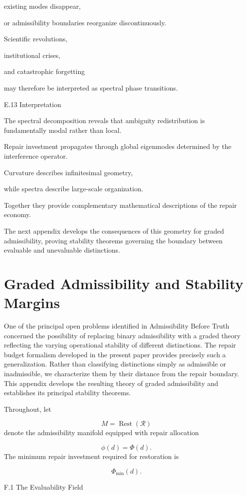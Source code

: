\documentclass[12pt,oneside]{article}
\theoremstyle{plain}
\theoremstyle{definition}
\theoremstyle{remark}
\DeclareMathOperator{\Rest}{Rest}
\begin{document}
existing modes disappear,

or admissibility boundaries reorganize discontinuously.

Scientific revolutions,

institutional crises,

and catastrophic forgetting

may therefore be interpreted as spectral phase transitions.


E.13 Interpretation

The spectral decomposition reveals that ambiguity redistribution is fundamentally modal rather than local.

Repair investment propagates through global eigenmodes determined by the interference operator.

Curvature describes infinitesimal geometry,

while spectra describe large-scale organization.

Together they provide complementary mathematical descriptions of the repair economy.

The next appendix develops the consequences of this geometry for graded admissibility, proving stability theorems governing the boundary between evaluable and unevaluable distinctions.

\section{Graded Admissibility and Stability Margins}

One of the principal open problems identified in Admissibility Before Truth concerned the possibility of replacing binary admissibility with a graded theory reflecting the varying operational stability of different distinctions. The repair budget formalism developed in the present paper provides precisely such a generalization. Rather than classifying distinctions simply as admissible or inadmissible, we characterize them by their distance from the repair boundary. This appendix develops the resulting theory of graded admissibility and establishes its principal stability theorems.

Throughout, let

\[
M=\Rest(\mathcal R)
\]
denote the admissibility manifold equipped with repair allocation

\[
\phi(d)=\Phi(d).
\]
The minimum repair investment required for restoration is

\[
\Phi_{\min}(d).
\]

F.1 The Evaluability Field
\end{document}
